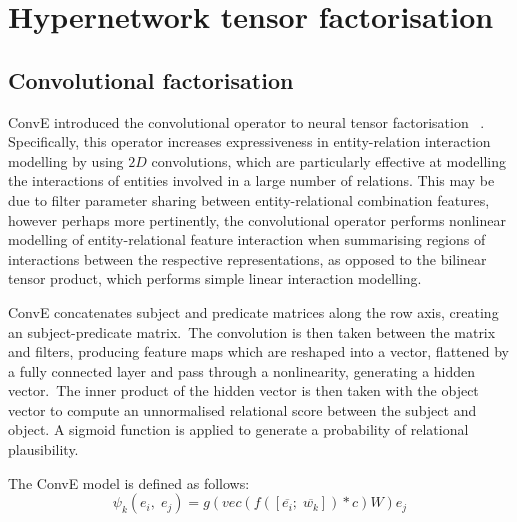 \section{Hypernetwork tensor factorisation}

\subsection{Convolutional factorisation}

ConvE introduced the convolutional operator to neural tensor factorisation \unskip ~\citep{dettmers2018convolutional}. Specifically, this operator increases expressiveness in entity-relation interaction modelling by using $ 2D $ convolutions, which are particularly effective at modelling the interactions of entities involved in a large number of relations. This may be due to filter parameter sharing between entity-relational combination features, however perhaps more pertinently, the convolutional operator performs nonlinear modelling of entity-relational feature interaction when summarising regions of interactions between the respective representations, as opposed to the bilinear tensor product, which performs simple linear interaction modelling. \par

\noindent ConvE concatenates subject and predicate matrices along the row axis, creating an subject-predicate matrix.\ The convolution is then taken between the matrix and filters, producing feature maps which are reshaped into a vector, flattened by a fully connected layer and pass through a nonlinearity, generating a hidden vector.\ The inner product of the hidden vector is then taken with the object vector to compute an unnormalised relational score between the subject and object. A sigmoid function is applied to generate a probability of relational plausibility. 

\noindent The ConvE model is defined as follows:
\begin{equation}
	\psi_k(e_i, \; e_j) = g(vec(f(\left [ \overline{e_i}; \; \overline{w_k} \right ]) * c)W )e_j
\end{equation}

